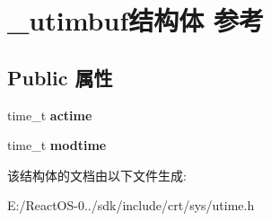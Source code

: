 \hypertarget{struct__utimbuf}{}\section{\+\_\+utimbuf结构体 参考}
\label{struct__utimbuf}
\subsection*{Public 属性}
\begin{DoxyCompactItemize}
\item 
\mbox{\label{struct__utimbuf_adc16acac55d07b180cb6e5e5effc9cc5}} 
time\+\_\+t {\bfseries actime}
\item 
\mbox{\label{struct__utimbuf_a81d1fa36e760c89ba0fcb8b0e351288c}} 
time\+\_\+t {\bfseries modtime}
\end{DoxyCompactItemize}


该结构体的文档由以下文件生成\+:\begin{DoxyCompactItemize}
\item 
E\+:/\+React\+O\+S-\/0../sdk/include/crt/sys/utime.\+h\end{DoxyCompactItemize}
